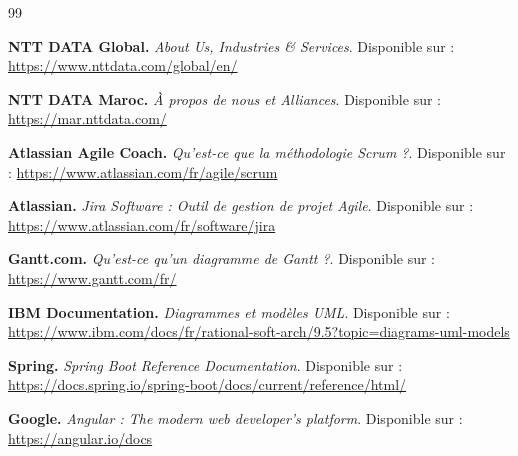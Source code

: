 \documentclass[12pt, a4paper, openany]{report}
\begin{document}
\begin{large}
\renewcommand{\baselinestretch}{1.5}\selectfont

\begingroup
\let\clearpage\relax 
\renewcommand{\bibname}{} 
\vspace{3cm} %

\begin{thebibliography}{99}
    \raggedright %
    \setlength{\itemsep}{0.2cm} %

    \textbf{NTT DATA Global.} \textit{About Us, Industries \& Services}. \newline
    Disponible sur : \url{https://www.nttdata.com/global/en/}

    \textbf{NTT DATA Maroc.} \textit{À propos de nous et Alliances}. \newline
    Disponible sur : \url{https://mar.nttdata.com/}

    \textbf{Atlassian Agile Coach.} \textit{Qu'est-ce que la méthodologie Scrum ?}. \newline
    Disponible sur : \url{https://www.atlassian.com/fr/agile/scrum}

    \textbf{Atlassian.} \textit{Jira Software : Outil de gestion de projet Agile}. \newline
    Disponible sur : \url{https://www.atlassian.com/fr/software/jira}

    \textbf{Gantt.com.} \textit{Qu'est-ce qu'un diagramme de Gantt ?}. \newline
    Disponible sur : \url{https://www.gantt.com/fr/}

    \textbf{IBM Documentation.} \textit{Diagrammes et modèles UML}. \newline
    Disponible sur : \url{https://www.ibm.com/docs/fr/rational-soft-arch/9.5?topic=diagrams-uml-models}

    \textbf{Spring.} \textit{Spring Boot Reference Documentation}. \newline
    Disponible sur : \url{https://docs.spring.io/spring-boot/docs/current/reference/html/}

    \textbf{Google.} \textit{Angular : The modern web developer's platform}. \newline
    Disponible sur : \url{https://angular.io/docs}


\end{thebibliography}
\end{large}
\end{document}
